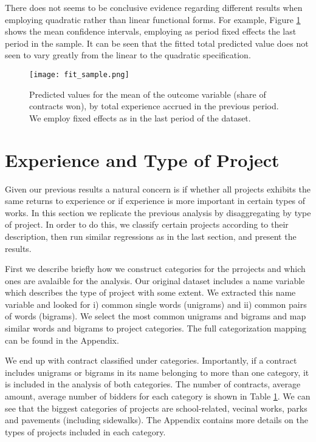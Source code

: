 \begin{table}[!htbp]
{}

\end{table}


There does not seems to be conclusive evidence regarding different results when employing quadratic rather than linear functional forms. For example, Figure \ref{fig:fit_sample} shows the mean confidence intervals, employing as period fixed effects the last period in the sample. It can be seen that the fitted total predicted value does not seen to vary greatly from the linear to the quadratic specification.

\begin{figure}[H]
        \centering
        \texttt{[image: fit\_sample.png]}
        \caption{ \small Predicted values for the mean of the outcome variable (share of contracts won), by total experience accrued in the previous period. We employ fixed effects as in the last period of the dataset.}
        \label{fig:fit_sample}
    \end{figure}




\section{Experience and Type of Project}
Given our previous results a natural concern is if whether all projects exhibits the same returns to experience or if experience is more important in certain types of works. In this section we replicate the previous analysis by disaggregating by type of project. In order to do this, we classify certain projects according to their description, then run similar regressions as in the last section, and present the results.

First we describe briefly how we construct categories for the prrojects and which ones are avalaible for the analysis. Our original dataset includes a name variable which describes the type of project with some extent. We extracted this name variable and looked for i) common single words (unigrams) and ii) common pairs of words (bigrams). We select the most common unigrams and bigrams and map similar words and bigrams to project categories. The full categorization mapping can be found in the Appendix.

We end up with contract classified under categories. Importantly, if a contract includes unigrams or bigrams in its name belonging to more than one category, it is included in the analysis of both categories. The number of contracts, average amount, average number of bidders for each category is shown in Table \ref{}. We can see that the biggest categories of projects are school-related, vecinal works, parks and pavements (including sidewalks). The Appendix contains more details on the types of projects included in each category.

